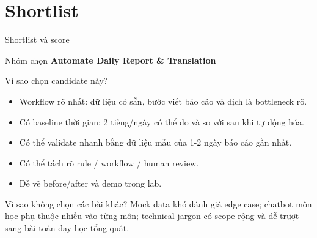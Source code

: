 \documentclass[aspectratio=169,11pt]{beamer}
\newcommand{\smallbullet}[1]{\item \small #1}
\begin{document}
\section{Shortlist}

\begin{frame}{Shortlist và score}
  \small

  \vspace{0.3cm}
  \begin{block}{Nhóm chọn}
    \textbf{Automate Daily Report \& Translation}
  \end{block}
\end{frame}

\begin{frame}{Vì sao chọn candidate này?}
  \begin{itemize}
    \smallbullet{Workflow rõ nhất: dữ liệu có sẵn, bước viết báo cáo và dịch là bottleneck rõ.}
    \smallbullet{Có baseline thời gian: 2 tiếng/ngày có thể đo và so với sau khi tự động hóa.}
    \smallbullet{Có thể validate nhanh bằng dữ liệu mẫu của 1-2 ngày báo cáo gần nhất.}
    \smallbullet{Có thể tách rõ rule / workflow / human review.}
    \smallbullet{Dễ vẽ before/after và demo trong lab.}
  \end{itemize}

  \vspace{0.2cm}
  \begin{block}{Vì sao không chọn các bài khác?}
    Mock data khó đánh giá edge case; chatbot môn học phụ thuộc nhiều vào từng môn; technical jargon có scope rộng và dễ trượt sang bài toán dạy học tổng quát.
  \end{block}
\end{frame}
\end{document}
